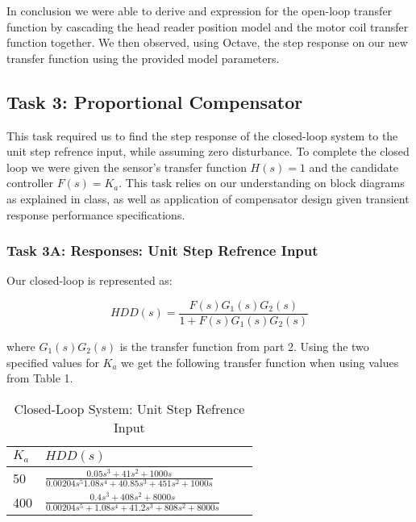 \documentclass{article}
\begin{document}
In conclusion we were able to derive and expression for the open-loop
transfer function by cascading the head reader position model and the
motor coil transfer function together. We then observed, using Octave,
the step response on our new transfer function using the provided
model parameters.

\subsection*{Task 3: Proportional Compensator}

This task required us to find the step response of the closed-loop system to
the unit step refrence input, while assuming zero disturbance. To complete the
closed loop we were given the sensor's transfer function $H(s) = 1$ and the
candidate controller $F(s) = K_a$. This task relies on our understanding on
block diagrams as explained in class, as well as application of compensator
design given transient response performance specifications.

\subsubsection*{Task 3A: Responses: Unit Step Refrence Input}


Our closed-loop is represented as: 

$$HDD(s) = \frac{F(s)G_1(s)G_2(s)}{1 + F(s)G_1(s)G_2(s)}$$

\noindent
where $G_1(s)G_2(s)$ is the transfer function from part 2. Using the two
specified values for $K_a$ we get the following transfer function when using
values from Table 1.

\begin{table}[H]
\begin{center}
  \begin{tabular}{ | l | l | l | p{5cm} |}
  \hline
  \textbf{$K_a$} & \textbf{$HDD(s)$}  \\ \hline
  50 & $\frac{0.05s^3 + 41s^2 + 1000s}{0.00204s^5 1.08s^4 + 40.85 s^3 
  + 451 s^2  + 1000s}$\\ \hline 
  400 & $\frac{0.4s^3 + 408s^2 + 8000s}{0.00204s^5 + 1.08s^4 + 41.2 s^3
  + 808 s^2 + 8000 s}$  \\ \hline
 \end{tabular}
\end{center}
\caption{Closed-Loop System: Unit Step Refrence Input}
\end{table}
\end{document}
